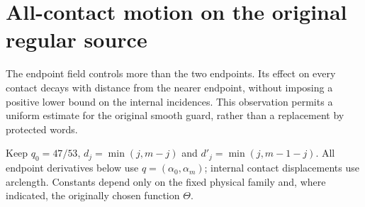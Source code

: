 \section{All-contact motion on the original regular source}
\label{sec:v78-motion}
The endpoint field controls more than the two endpoints. Its effect
on every contact decays with distance from the nearer endpoint,
without imposing a positive lower bound on the internal incidences.
This observation permits a uniform estimate for the original smooth
guard, rather than a replacement by protected words.

Keep $q_0=47/53$, $d_j=\min(j,m-j)$ and
$d'_j=\min(j,m-1-j)$. All endpoint derivatives below use
$q=(\alpha_0,\alpha_m)$; internal contact displacements use
arclength. Constants depend only on the fixed physical family and,
where indicated, the originally chosen function $\Theta$.

